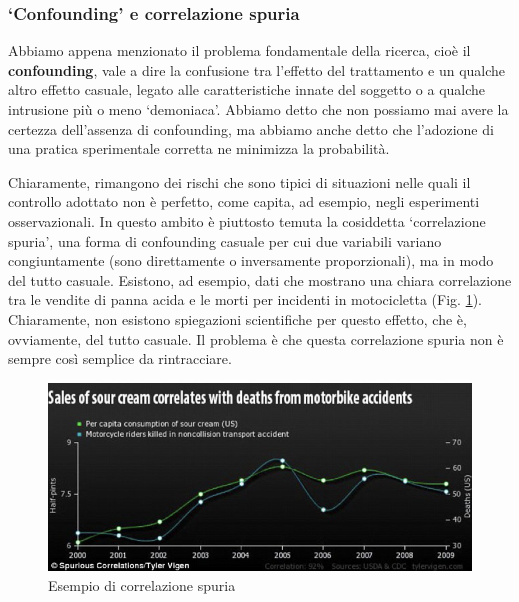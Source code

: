 \documentclass[a4paper,12pt,oneside]{book}
\begin{document}
\hypertarget{confounding-e-correlazione-spuria}{%
\subsubsection{`Confounding' e correlazione spuria}\label{confounding-e-correlazione-spuria}}

Abbiamo appena menzionato il problema fondamentale della ricerca, cioè il \textbf{confounding}, vale a dire la confusione tra l'effetto del trattamento e un qualche altro effetto casuale, legato alle caratteristiche innate del soggetto o a qualche intrusione più o meno `demoniaca'. Abbiamo detto che non possiamo mai avere la certezza dell'assenza di confounding, ma abbiamo anche detto che l'adozione di una pratica sperimentale corretta ne minimizza la probabilità.

Chiaramente, rimangono dei rischi che sono tipici di situazioni nelle quali il controllo adottato non è perfetto, come capita, ad esempio, negli esperimenti osservazionali. In questo ambito è piuttosto temuta la cosiddetta `correlazione spuria', una forma di confounding casuale per cui due variabili variano congiuntamente (sono direttamente o inversamente proporzionali), ma in modo del tutto casuale. Esistono, ad esempio, dati che mostrano una chiara correlazione tra le vendite di panna acida e le morti per incidenti in motocicletta (Fig. \ref{fig:figName22}). Chiaramente, non esistono spiegazioni scientifiche per questo effetto, che è, ovviamente, del tutto casuale. Il problema è che questa correlazione spuria non è sempre così semplice da rintracciare.

\begin{figure}

{\centering \includegraphics[width=0.9\linewidth]{_images/PannaAcida} 

}

\caption{Esempio di correlazione spuria}\label{fig:figName22}
\end{figure}
\end{document}
